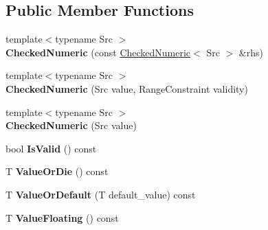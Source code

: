 \subsection*{Public Member Functions}
\begin{DoxyCompactItemize}
\item 
{\footnotesize template$<$typename Src $>$ }\\{\bfseries Checked\+Numeric} (const \hyperlink{classv8_1_1base_1_1internal_1_1_checked_numeric}{Checked\+Numeric}$<$ Src $>$ \&rhs)\hypertarget{classv8_1_1base_1_1internal_1_1_checked_numeric_acb1daa3773742023407941030fc37444}{}\label{classv8_1_1base_1_1internal_1_1_checked_numeric_acb1daa3773742023407941030fc37444}

\item 
{\footnotesize template$<$typename Src $>$ }\\{\bfseries Checked\+Numeric} (Src value, Range\+Constraint validity)\hypertarget{classv8_1_1base_1_1internal_1_1_checked_numeric_a56780ab8a1b1471f8ffa686b4298ba57}{}\label{classv8_1_1base_1_1internal_1_1_checked_numeric_a56780ab8a1b1471f8ffa686b4298ba57}

\item 
{\footnotesize template$<$typename Src $>$ }\\{\bfseries Checked\+Numeric} (Src value)\hypertarget{classv8_1_1base_1_1internal_1_1_checked_numeric_afbc3fbba30b10b94b648a7ada32ec5c2}{}\label{classv8_1_1base_1_1internal_1_1_checked_numeric_afbc3fbba30b10b94b648a7ada32ec5c2}

\item 
bool {\bfseries Is\+Valid} () const \hypertarget{classv8_1_1base_1_1internal_1_1_checked_numeric_a1e8bdc28993e5638d525b31392881ac1}{}\label{classv8_1_1base_1_1internal_1_1_checked_numeric_a1e8bdc28993e5638d525b31392881ac1}

\item 
T {\bfseries Value\+Or\+Die} () const \hypertarget{classv8_1_1base_1_1internal_1_1_checked_numeric_ad29e2b59debb26e1cb0951120425eea9}{}\label{classv8_1_1base_1_1internal_1_1_checked_numeric_ad29e2b59debb26e1cb0951120425eea9}

\item 
T {\bfseries Value\+Or\+Default} (T default\+\_\+value) const \hypertarget{classv8_1_1base_1_1internal_1_1_checked_numeric_a5363734b381cf4e73cf5cc254a0163e7}{}\label{classv8_1_1base_1_1internal_1_1_checked_numeric_a5363734b381cf4e73cf5cc254a0163e7}

\item 
T {\bfseries Value\+Floating} () const \hypertarget{classv8_1_1base_1_1internal_1_1_checked_numeric_a91cd8089e2ac0cf2a494b320e35d4a19}{}\label{classv8_1_1base_1_1internal_1_1_checked_numeric_a91cd8089e2ac0cf2a494b320e35d4a19}


\end{DoxyCompactItemize}
